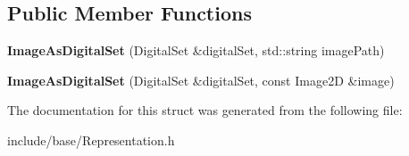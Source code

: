 \subsection*{Public Member Functions}
\begin{DoxyCompactItemize}
\item 
\mbox{\label{structDIPaCUS_1_1ImageAsDigitalSet_a6ab00dc1a5e10ad6288d327b44f72676}} 
{\bfseries Image\+As\+Digital\+Set} (Digital\+Set \&digital\+Set, std\+::string image\+Path)
\item 
\mbox{\label{structDIPaCUS_1_1ImageAsDigitalSet_afbae1ba9538d1a2a4eb374ee95ec834c}} 
{\bfseries Image\+As\+Digital\+Set} (Digital\+Set \&digital\+Set, const Image2D \&image)
\end{DoxyCompactItemize}


The documentation for this struct was generated from the following file\+:\begin{DoxyCompactItemize}
\item 
include/base/Representation.\+h\end{DoxyCompactItemize}
